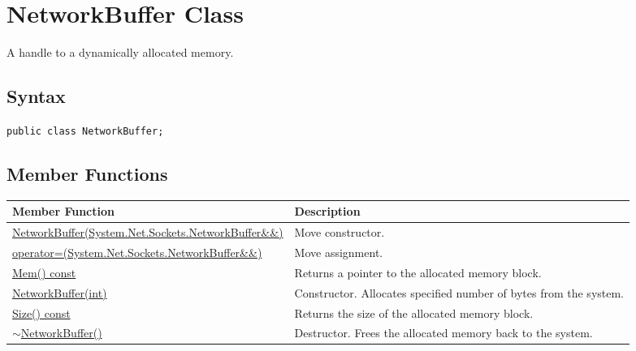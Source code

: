 \documentclass[a4paper,oneside,11.000000pt]{book}
\begin{document}
\hypertarget{System.Net.Sockets.NetworkBuffer}{\section{NetworkBuffer Class}}\begin{flushleft}
A handle to a dynamically allocated memory.

\end{flushleft}

\subsection*{Syntax}\texttt{public class NetworkBuffer;}
\subsection{Member Functions}
\begin{flushleft}
\begin{supertabular}[l]{!{\raggedright}p{7.575cm}!{\raggedright}p{7.575cm}}
\textbf{Member Function}
& \textbf{Description}
\\
\hline
\hyperlink{System.Net.Sockets.NetworkBuffer.constructor.P.System.Net.Sockets.NetworkBuffer.RR.System.Net.Sockets.NetworkBuffer}{NetworkBuffer(System.\-Net.\-Sockets.\-NetworkBuffer\&\-\&\-)}
& Move constructor.

\\
\hyperlink{System.Net.Sockets.NetworkBuffer.operator.assign.P.System.Net.Sockets.NetworkBuffer.RR.System.Net.Sockets.NetworkBuffer}{operator=(System.\-Net.\-Sockets.\-NetworkBuffer\&\-\&\-)}
& Move assignment.

\\
\hyperlink{System.Net.Sockets.NetworkBuffer.Mem.C.P.System.Net.Sockets.NetworkBuffer}{Mem() const}
& Returns a pointer to the allocated memory block.

\\
\hyperlink{System.Net.Sockets.NetworkBuffer.constructor.P.System.Net.Sockets.NetworkBuffer.int}{NetworkBuffer(int)}
& Constructor. Allocates specified number of bytes from the system.

\\
\hyperlink{System.Net.Sockets.NetworkBuffer.Size.C.P.System.Net.Sockets.NetworkBuffer}{Size() const}
& Returns the size of the allocated memory block.

\\
\hyperlink{System.Net.Sockets.NetworkBuffer.destructor.P.System.Net.Sockets.NetworkBuffer}{$\sim$NetworkBuffer()}
& Destructor. Frees the allocated memory back to the system.

\\
\end{supertabular}

\end{flushleft}
\clearpage
\end{document}
